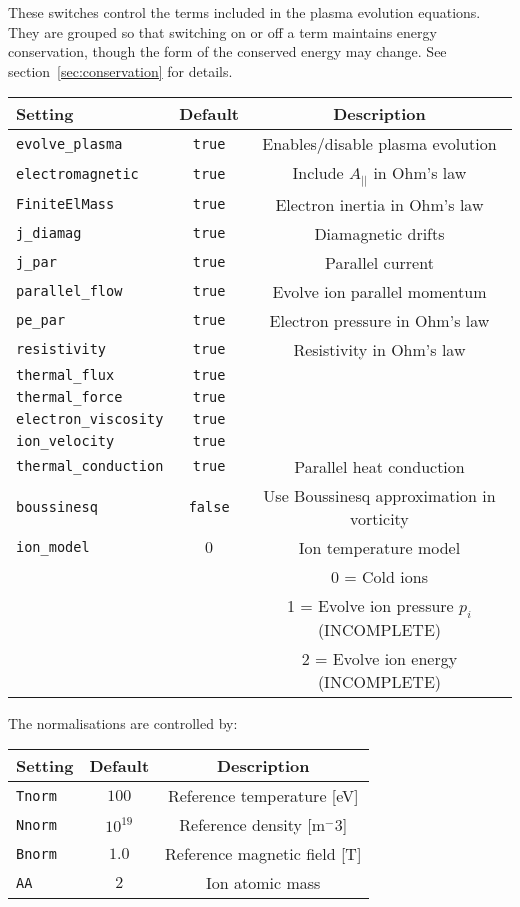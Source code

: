 \documentclass[12pt,a4paper]{article}
\begin{document}
These switches control the terms included in the plasma
evolution equations. They are grouped so that switching on
or off a term maintains energy conservation, though the
form of the conserved energy may change. See section~\ref{sec:conservation} for details.
\begin{center}
\begin{tabular}{l c c}
  Setting & Default & Description \\
  \hline
  \texttt{evolve\_plasma}  & \texttt{true} & Enables/disable plasma evolution \\
  \texttt{electromagnetic}  &  \texttt{true} & Include $A_{||}$ in Ohm's law\\
  \texttt{FiniteElMass}  & \texttt{true} & Electron inertia in Ohm's law \\
  \texttt{j\_diamag} & \texttt{true} & Diamagnetic drifts \\
  \texttt{j\_par} & \texttt{true} & Parallel current \\
  \texttt{parallel\_flow} & \texttt{true} & Evolve ion parallel momentum \\
  \texttt{pe\_par} & \texttt{true} & Electron pressure in Ohm's law \\
  \texttt{resistivity} & \texttt{true} & Resistivity in Ohm's law \\
  \texttt{thermal\_flux} & \texttt{true} &  \\
  \texttt{thermal\_force} & \texttt{true} &  \\
  \texttt{electron\_viscosity} & \texttt{true} &  \\
  \texttt{ion\_velocity} & \texttt{true} &  \\
  \texttt{thermal\_conduction} & \texttt{true} & Parallel heat conduction \\
  \texttt{boussinesq} & \texttt{false} & Use Boussinesq approximation in vorticity \\
  \texttt{ion\_model} & $0$ & Ion temperature model \\
  & & 0 = Cold ions \\
  & & 1 = Evolve ion pressure $p_i$ (INCOMPLETE)\\
  & & 2 = Evolve ion energy (INCOMPLETE) \\
  \hline
\end{tabular}
\end{center}

The normalisations are controlled by:
\begin{center}
\begin{tabular}{l c c}
  Setting & Default & Description \\
  \hline
  \texttt{Tnorm} & $100$ & Reference temperature [eV] \\
  \texttt{Nnorm} & $10^{19}$ & Reference density [m$^-3$] \\
  \texttt{Bnorm} & $1.0$ & Reference magnetic field [T] \\
  \texttt{AA} & $2$ & Ion atomic mass \\
  \hline
\end{tabular}
\end{center}
\end{document}
